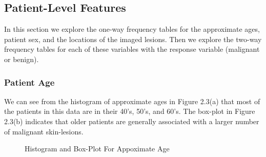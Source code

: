\documentclass [MAS] {uclathes}
\begin{document}
\subsection{Patient-Level Features}

In this section we explore the one-way frequency tables for the approximate ages, patient sex, and the locations of the imaged lesions. Then we explore the two-way frequency tables for each of these variables with the response variable (malignant or benign).

\subsubsection*{Patient Age}

We can see from the histogram of approximate ages in Figure 2.3(a) that most of the patients in this data are in their 40's, 50's, and 60's. The box-plot in Figure 2.3(b) indicates that older patients are generally associated with a larger number of malignant skin-lesions.

\begin{figure}[hbt!]
\hspace*{\fill}
\centering
{}\hspace{0.5em}
\hspace*{\fill}
\label{fig:age_eda}
\vspace{0cm}
\caption{Histogram and Box-Plot For Appoximate Age}
\end{figure}
\end{document}
